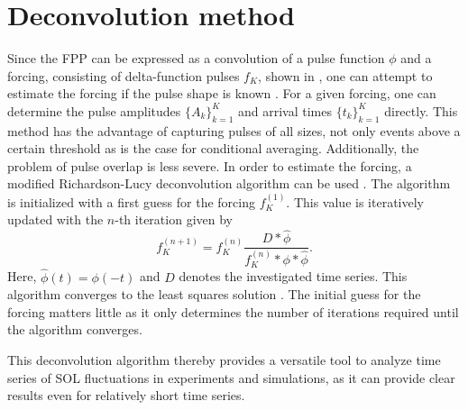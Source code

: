 \section{Deconvolution method}
Since the FPP can be expressed as a convolution of a pulse function $\phi$ and a forcing, consisting of delta-function pulses $f_K$, shown in , one can attempt to estimate the forcing if the pulse shape is known \cite{theodorsen2018universality, decristoforo2020intermittent, kube2020comparison}. For a given forcing, one can determine the pulse amplitudes $\{ A_k \}_{k=1}^K$ and arrival times $\{ t_k \}_{k=1}^K$ directly. This method has the advantage of capturing pulses of all sizes, not only events above a certain threshold as is the case for conditional averaging. Additionally, the problem of pulse overlap is less severe. In order to estimate the forcing, a modified Richardson-Lucy deconvolution algorithm can be used \cite{richardson1972bayesian,lucy1974iterative}. The algorithm is initialized with a first guess for the forcing $f_K^{(1)}$. This value is iteratively updated with the $n$-th iteration given by
\begin{equation}
	f_K^{(n+1)} = f_K^{(n)} \frac{D*\widehat{\phi}}{f_K^{(n)}*\phi*\widehat{\phi}}.
\end{equation}
Here, $\widehat{\phi}(t) = \phi(-t)$ and $D$ denotes the investigated time series. This algorithm converges to the least squares solution \cite{dell2007model}. The initial guess for the forcing matters little as it only determines the number of iterations required until the algorithm converges. 

This deconvolution algorithm thereby provides a versatile tool to analyze time series of SOL fluctuations in experiments and simulations, as it can provide clear results even for relatively short time series.   


